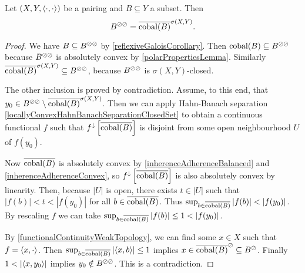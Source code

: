 \begin{proposition} \label{bipolarTheorem}
Let $\left( X,Y,\left\langle \cdot,\cdot \right\rangle \right)$ be a pairing and $B\subseteq Y$ a subset. Then
\[ B^{\oslash\oslash} = \overline{\operatorname{cobal}(B)}^{\sigma(X,Y)}. \]
\end{proposition}
\begin{proof}
We have $B\subseteq B^{\oslash\oslash}$ by \ref{reflexiveGaloisCorollary}. Then $\operatorname{cobal}(B) \subseteq B^{\oslash\oslash}$ because $B^{\oslash\oslash}$ is absolutely convex by \ref{polarPropertiesLemma}. Similarly $\overline{\operatorname{cobal}(B)}^{\sigma(X,Y)} \subseteq B^{\oslash\oslash}$, because $B^{\oslash\oslash}$ is $\sigma(X,Y)$-closed.

The other inclusion is proved by contradiction. Assume, to this end, that $y_0\in B^{\oslash\oslash} \setminus \overline{\operatorname{cobal}(B)}^{\sigma(X,Y)}$. Then we can apply Hahn-Banach separation \ref{locallyConvexHahnBanachSeparationClosedSet} to obtain a continuous functional $f$ such that $f^\downarrow\left[\overline{\operatorname{cobal}(B)}\right]$ is disjoint from some open neighbourhood $U$ of $f(y_0)$.

Now $\overline{\operatorname{cobal}(B)}$ is absolutely convex by \ref{inherenceAdherenceBalanced} and \ref{inherenceAdherenceConvex}, so $f^\downarrow\left[\overline{\operatorname{cobal}(B)}\right]$ is also absolutely convex by linearity. Then, because $|U|$ is open, there exists $t\in |U|$ such that $|f(b)| < t < |f(y_0)|$ for all $b\in \overline{\operatorname{cobal}(B)}$. Thus $\sup_{b\in \overline{\operatorname{cobal}(B)}}|f(b)| < |f(y_0)|$. By rescaling $f$ we can take $\sup_{b\in \overline{\operatorname{cobal}(B)}}|f(b)| \leq 1 < |f(y_0)|$.

By \ref{functionalContinuityWeakTopology}, we can find some $x\in X$ such that $f = \left\langle x,\cdot \right\rangle$. Then $\sup_{b\in \overline{\operatorname{cobal}(B)}}\left|\left\langle x, b \right\rangle\right| \leq 1$ implies $x\in \overline{\operatorname{cobal}(B)}^\oslash \subseteq B^\oslash$. Finally $1 < \left|\left\langle x, y_0 \right\rangle\right|$ implies $y_0\notin B^{\oslash\oslash}$. This is a contradiction.
\end{proof}


